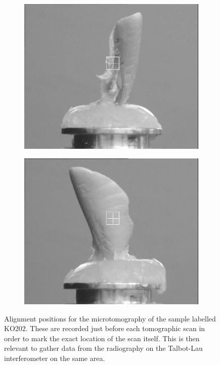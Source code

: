 \begin{figure}[htb]
    \centering
    \begin{subfigure}[b]{.49\textwidth}
    \centering
    \includegraphics[width=\textwidth]{gfx/lung-paper-figures/KO202_LL_control_1_00degree.png}
    \caption{}
    \label{fig:reconstructed}
    \end{subfigure}
    \hfill
    \begin{subfigure}[b]{.49\textwidth}
    \centering
    \includegraphics[width=\textwidth]{gfx/lung-paper-figures/KO202_LL_control_1_90degree.png}
    \caption{}
    \label{fig:lung-alignment}
    \end{subfigure}
    \caption[Alignment for lung microtomography.]{Alignment positions
    for the microtomography of the sample labelled KO202. These are recorded
just before each tomographic scan in order to mark the exact location of the
scan itself. This is then relevant to gather data from the radiography on
the Talbot-Lau interferometer on the same area.}
\end{figure}

